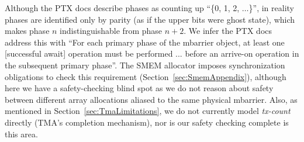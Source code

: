 

Although the PTX docs describe phases as counting up ``\{0, 1, 2, $\ldots$\}'',
in reality phases are identified only by parity (as if the upper bits were ghost state),
which makes phase $n$ indistinguishable from phase $n + 2$.
We infer the PTX docs \cite{ptx} address this with
``For each primary phase of the mbarrier object,
at least one [successful await]
operation must be performed ...  %
before an arrive-on operation in the subsequent primary phase''.
The \sporkName{} SMEM allocator imposes synchronization obligations to check this requirement
(Section~\ref{sec:SmemAppendix}),
although here we have a safety-checking blind spot as we do not reason
about safety between different array allocations aliased to the same physical mbarrier.
Also, as mentioned in Section~\ref{sec:TmaLimitations},
we do not currently model \emph{tx-count} directly (TMA's completion mechanism),
nor is our safety checking complete is this area.
